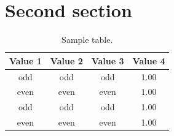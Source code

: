 \documentclass[12pt]{ctexart}
\begin{document}
\section{Second section}

\lipsum[1]
\begin{table}[!h]
\centering
\caption{Sample table.}
\begin{tabular}{cccc}
\toprule
Value 1 & Value 2 & Value 3 & Value 4\\
\midrule
 odd     & odd   & odd & 1.00 \\
 even    & even  & even& 1.00 \\
 odd     & odd   & odd & 1.00 \\
 even    & even  & even& 1.00 \\
\bottomrule
\end{tabular}
\end{table}

\lipsum[1]

\lipsum[1]
\frameboxend
\end{document}

